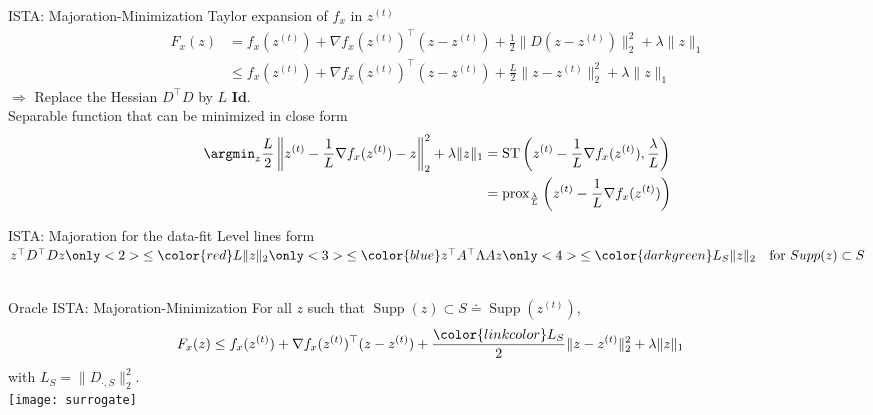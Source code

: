 \documentclass{beamer}
\DeclareMathOperator*{\supp}{Supp}
\begin{document}
\begin{frame}[t]{ISTA: Majoration-Minimization}
    Taylor expansion of $f_x$ in $z^{(t)}$
    \begin{align*}
        F_x(z) &  = f_x(z^{(t)}) + \nabla f_x(z^{(t)})^\top(z - z^{(t)})
                    + \frac{1}{2}\|D(z-z^{(t)})\|_2^2+ \lambda\|z\|_1\\
               & \le f_x(z^{(t)}) + \nabla f_x(z^{(t)})^\top(z - z^{(t)}) + \frac{L}{2}\|z - z^{(t)}\|_2^2 + \lambda\|z\|_1
    \end{align*}
    $\Rightarrow$ Replace the Hessian $D^\top D$ by $L \textbf{ Id}$.\\[2em]

    Separable function that can be minimized in close form
    \begin{align*}
        \argmin_z \frac{L}{2}\left\|z^{(t)} - \frac{1}{L}\nabla f_x(z^{(t)}) - z\right\|_2^2 + \lambda\|z\|_1
        & = \text{ST}\left(z^{(t)} - \frac{1}{L}\nabla f_x(z^{(t)}),
                           \frac{\lambda}{L}\right)\\
        & = \text{prox}_{\frac{\lambda}{L}}\left(z^{(t)} - \frac{1}{L}\nabla f_x(z^{(t)})\right)
    \end{align*}
\end{frame}

\begin{frame}{ISTA: Majoration for the data-fit}
    \myitem{} Level lines form $z^\top D^\top D z
                       \only<2>{\le \color{red} L \|z\|_2}
                       \only<3>{\le \color{blue} z^\top A^\top \Lambda A z}
                       \only<4>{\le {\color{darkgreen} L_S \|z\|_2}
                            ~~ \text{ for } Supp(z) \subset S}$
              \\
    \centering
    \\
\end{frame}


\begin{frame}[t]{Oracle ISTA: Majoration-Minimization}
    For all $z$ such that $\supp(z) \subset S \doteq \supp(z^{(t)})$,
    \begin{align*}
    F_x(z) & \le f_x(z^{(t)}) + \nabla f_x(z^{(t)})^\top(z - z^{(t)})
           + \frac{\color{linkcolor} L_S}{2}\|z - z^{(t)}\|_2^2 + \lambda\|z\|_1
    \end{align*}
    with $L_S = \|D_{\cdot,S}\|_2^2$.\\[1em]

\centering
\texttt{[image: surrogate]}\\

\end{frame}
\end{document}
